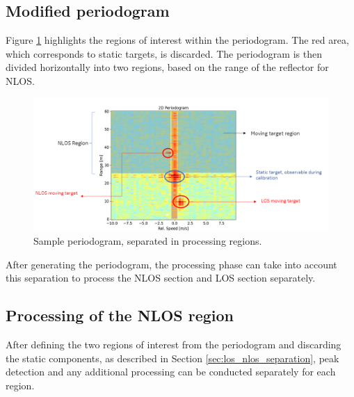 	
		\subsection{Modified periodogram}
		
			Figure \ref{fig:Rad_nlos_los_separation} highlights the regions of interest within the periodogram.
			The red area, which corresponds to static targets, is discarded. The periodogram is then divided horizontally into two regions, based on the range of the reflector for NLOS.
			
			\begin{figure}[H]
				\centering
				\includegraphics[width=1.1\textwidth]{Images/Test1/nlos-los-separation.png}
				\caption{\small Sample periodogram, separated in processing regions.}
				\label{fig:Rad_nlos_los_separation}
			\end{figure}
			
			
			After generating the periodogram, the processing phase can take into account this separation to process the NLOS section and LOS section separately.
		
		\subsection{Processing of the NLOS region}
		
			After defining the two regions of interest from the periodogram and discarding the static components, as described in Section \ref{sec:los_nlos_separation}, peak detection and any additional processing can be conducted separately for each region. 
			
			
